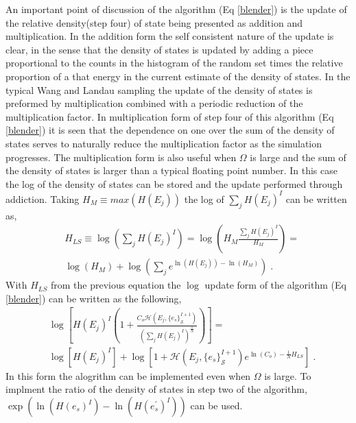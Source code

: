 \documentclass[aps,prl,reprint,superscriptaddress,showkeys]{revtex4-1}
\begin{document}
An important point of discussion of the algorithm (Eq \ref{blender}) is the update of the relative density(step four) of state being presented as addition and multiplication. In the addition form the self consistent nature of the update is clear, in the sense that the  density of states is updated by adding a  piece proportional to the counts in the histogram of the random set times the relative proportion of a that energy in the current estimate of the density of states.  In the typical Wang and Landau sampling the update of the density of states is preformed by multiplication combined with a periodic reduction of the multiplication factor. In multiplication form of step four of this algorithm (Eq \ref{blender}) it is seen that the dependence on one over the sum of the density of states serves to naturally reduce the multiplication factor as the simulation progresses. The multiplication form is also useful when $\Omega$ is large and the sum of the density of states is larger than a typical floating point number. In this case the log of the density of states can be stored and the update performed through addiction. Taking $H_M \equiv  max(H(E_j))$ the log of $\sum_j H(E_j)^{I}$ can be written as, 
\begin{equation}
\begin{split}
&H_{LS} \equiv \log(\sum_j H(E_j)^{I}) = \log(H_M \frac{\sum_j H(E_j)^{I}}{H_M})=\\
&\log(H_M) + \log(\sum_j e^{\ln(H(E_j)) - \ln(H_M)} ) \;.
\end{split}
\end{equation} 
With $H_{LS}$ from the previous equation  the $\log$ update form of the algorithm (Eq \ref{blender}) can be written as the following, 
\begin{equation}
\begin{split}
& \log[ H(E_j)^{I}( 1 +  \frac{C_o \mathcal{H}(E_j,\{e_s\}_{\mathcal{S}}^{I+1}) }{ (\sum_j H(E_j)^{I})^{\frac{1}{N} } } ) ]=\\
& \log[ H(E_j)^{I} ] + \log[1 +   \mathcal{H}(E_j,\{e_s\}_{\mathcal{S}}^{I+1})e^{\ln(C_o)-\frac{1}{N}H_{LS}}] \;.
\end{split}
\end{equation}
In this form  the alogrithm can be implemented even when $\Omega$ is large. To implment the ratio of the density of states in step two of the algorithm, $\exp( \ln(H(e_s)^{I}) - \ln(H(e_s^{'})^{I}))$ can be used. 
\end{document}
